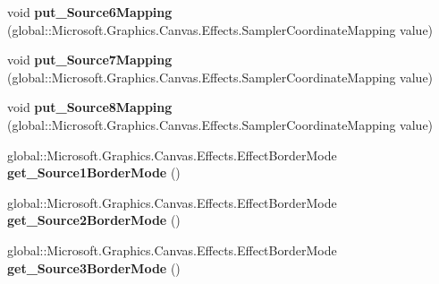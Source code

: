 \begin{DoxyCompactItemize}
\item 
\mbox{\label{class_microsoft_1_1_graphics_1_1_canvas_1_1_effects_1_1_pixel_shader_effect_a842da228c459e721722007e884925a9d}} 
void {\bfseries put\+\_\+\+Source6\+Mapping} (global\+::\+Microsoft.\+Graphics.\+Canvas.\+Effects.\+Sampler\+Coordinate\+Mapping value)
\item 
\mbox{\label{class_microsoft_1_1_graphics_1_1_canvas_1_1_effects_1_1_pixel_shader_effect_a9943d55826ab5b438279f737c0439a20}} 
void {\bfseries put\+\_\+\+Source7\+Mapping} (global\+::\+Microsoft.\+Graphics.\+Canvas.\+Effects.\+Sampler\+Coordinate\+Mapping value)
\item 
\mbox{\label{class_microsoft_1_1_graphics_1_1_canvas_1_1_effects_1_1_pixel_shader_effect_a480efd4c5b2e1366e93620794ee25327}} 
void {\bfseries put\+\_\+\+Source8\+Mapping} (global\+::\+Microsoft.\+Graphics.\+Canvas.\+Effects.\+Sampler\+Coordinate\+Mapping value)
\item 
\mbox{\label{class_microsoft_1_1_graphics_1_1_canvas_1_1_effects_1_1_pixel_shader_effect_a6408c6415d249347b33ecaf5f2d6098d}} 
global\+::\+Microsoft.\+Graphics.\+Canvas.\+Effects.\+Effect\+Border\+Mode {\bfseries get\+\_\+\+Source1\+Border\+Mode} ()
\item 
\mbox{\label{class_microsoft_1_1_graphics_1_1_canvas_1_1_effects_1_1_pixel_shader_effect_a153a72d638584b0ee6144e31d9f65114}} 
global\+::\+Microsoft.\+Graphics.\+Canvas.\+Effects.\+Effect\+Border\+Mode {\bfseries get\+\_\+\+Source2\+Border\+Mode} ()
\item 
\mbox{\label{class_microsoft_1_1_graphics_1_1_canvas_1_1_effects_1_1_pixel_shader_effect_a414df84a623b82634fb59ca67deec57b}} 
global\+::\+Microsoft.\+Graphics.\+Canvas.\+Effects.\+Effect\+Border\+Mode {\bfseries get\+\_\+\+Source3\+Border\+Mode} ()
\item 

\end{DoxyCompactItemize}
